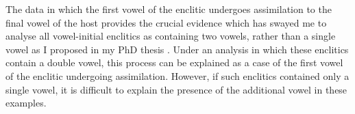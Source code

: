\begin{exe}
	\label{ex:RoqVowAssGlot}
\end{exe}


The data in which the first vowel of the enclitic
undergoes assimilation to the final vowel of the host
provides the crucial evidence which has swayed me to analyse
all vowel-initial enclitics as containing two vowels,
rather than a single vowel as I proposed in my PhD thesis \citep{ed16b}.
Under an analysis in which these enclitics contain a double vowel,
this process can be explained as a case of the first
vowel of the enclitic undergoing assimilation.
However, if such enclitics contained only a single vowel,
it is difficult to explain the presence of the additional vowel in these examples.
